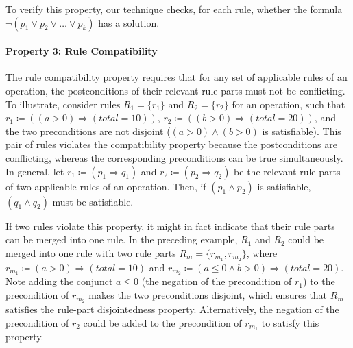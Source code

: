 To verify this property, our technique checks, for each rule, whether the
formula $\neg(p_1 \vee p_2 \vee \ldots \vee p_k)$ has a solution.


\paragraph*{Property 3: Rule Compatibility}
The rule compatibility property requires that for any set of applicable rules of
an operation, the postconditions of their relevant rule parts must not be
conflicting. To illustrate, consider rules $R_1 = \{r_1\}$ and $R_2 = \{r_2\}$
for an operation, such that $r_1 \coloneqq ((a > 0) \Longrightarrow (total =
10))$, $r_2 \coloneqq ((b > 0) \Longrightarrow (total = 20))$, and the two
preconditions are not disjoint (\ie $(a > 0) \wedge (b > 0)$ is
satisfiable). This pair of rules violates the compatibility property because the
postconditions are conflicting, whereas the corresponding preconditions can be
true simultaneously. In general, let $r_1 \coloneqq (p_1 \Longrightarrow q_1)$
and $r_2 \coloneqq (p_2 \Longrightarrow q_2)$ be the relevant rule parts of two
applicable rules of an operation. Then, if $(p_1 \wedge p_2)$ is satisfiable,
$(q_1 \wedge q_2)$ must be satisfiable.

If two rules violate this property, it might in fact indicate that their rule
parts can be merged into one rule. In the preceding example, $R_1$ and $R_2$
could be merged into one rule with two rule parts $R_m = \{r_{m_1}, r_{m_2}\}$,
where $r_{m_1} \coloneqq (a > 0) \Longrightarrow (total = 10)$ and $r_{m_2}
\coloneqq (a \leq 0 \wedge b > 0) \Longrightarrow (total = 20)$. Note adding the
conjunct $a \leq 0$ (the negation of the precondition of $r_1$) to the
precondition of $r_{m_2}$ makes the two preconditions disjoint, which ensures
that $R_m$ satisfies the rule-part disjointedness property. Alternatively, the
negation of the precondition of $r_2$ could be added to the precondition of
$r_{m_1}$ to satisfy this property.

